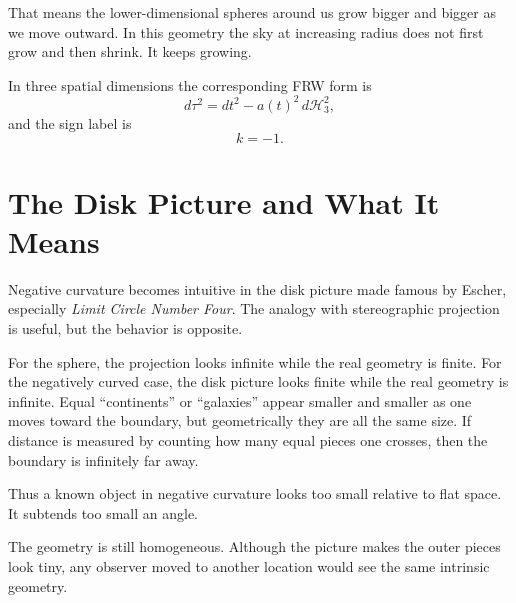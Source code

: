 That means the lower-dimensional spheres around us grow bigger and bigger as we move outward. In this geometry the sky at increasing radius does not first grow and then shrink. It keeps growing.

In three spatial dimensions the corresponding FRW form is
\begin{equation}
d\tau^2=dt^2-a(t)^2\,d\mathcal H_3^2,
\end{equation}
and the sign label is
\begin{equation}
k=-1.
\end{equation}

\section{The Disk Picture and What It Means}

Negative curvature becomes intuitive in the disk picture made famous by Escher, especially \emph{Limit Circle Number Four}. The analogy with stereographic projection is useful, but the behavior is opposite.

For the sphere, the projection looks infinite while the real geometry is finite. For the negatively curved case, the disk picture looks finite while the real geometry is infinite. Equal ``continents'' or ``galaxies'' appear smaller and smaller as one moves toward the boundary, but geometrically they are all the same size. If distance is measured by counting how many equal pieces one crosses, then the boundary is infinitely far away.

Thus a known object in negative curvature looks too small relative to flat space. It subtends too small an angle.

The geometry is still homogeneous. Although the picture makes the outer pieces look tiny, any observer moved to another location would see the same intrinsic geometry.

\begin{classroomqa}
\end{classroomqa}

\begin{classroomqa}
\end{classroomqa}

